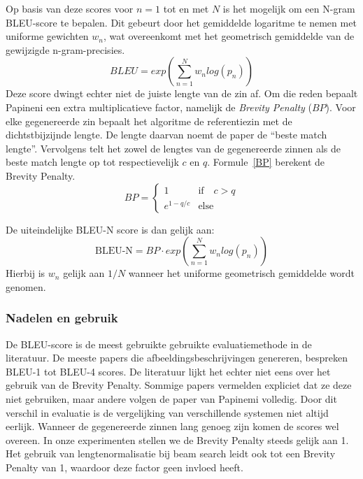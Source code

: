 Op basis van deze scores voor $n=1$ tot en met $N$ is het mogelijk om een N-gram BLEU-score te bepalen. Dit gebeurt door het gemiddelde logaritme te nemen met uniforme gewichten $w_n$, wat overeenkomt met het geometrisch gemiddelde van de gewijzigde n-gram-precisies.
\begin{equation}
BLEU = exp(\sum\limits_{n=1}^N w_nlog(p_n))
\end{equation}
Deze score dwingt echter niet de juiste lengte van de zin af. Om die reden bepaalt Papineni een extra multiplicatieve factor, namelijk de \emph{Brevity Penalty} ($BP$). Voor elke gegenereerde zin bepaalt het algoritme de referentiezin met de dichtstbijzijnde lengte. De lengte daarvan noemt de paper de ``beste match lengte''. Vervolgens telt het zowel de lengtes van de gegenereerde zinnen als de beste match lengte op tot respectievelijk $c$ en $q$. Formule~\eqref{BP} berekent de Brevity Penalty.
\begin{equation}BP=
 \begin{cases}
1 & \textrm{if}\quad c > q \\
e^{1-q/c} & \textrm{else}
\end{cases}
\label{BP}
\end{equation}

De uiteindelijke BLEU-N score is dan gelijk aan:
\begin{equation}
\text{BLEU-N} = BP\cdot exp(\sum\limits_{n=1}^N w_nlog(p_n))
\end{equation}
Hierbij is $w_n$ gelijk aan $1/N$ wanneer het uniforme geometrisch gemiddelde wordt genomen.

\subsubsection{Nadelen en gebruik}
De BLEU-score is de meest gebruikte gebruikte evaluatiemethode in de literatuur. De meeste papers die afbeeldingsbeschrijvingen genereren, bespreken BLEU-1 tot BLEU-4 scores. De literatuur lijkt het echter niet eens over het gebruik van de Brevity Penalty. Sommige papers vermelden expliciet dat ze deze niet gebruiken, maar andere volgen de paper van Papinemi volledig. Door dit verschil in evaluatie is de vergelijking van verschillende systemen niet altijd eerlijk. Wanneer de gegenereerde zinnen lang genoeg zijn komen de scores wel overeen.
In onze experimenten stellen we de Brevity Penalty steeds gelijk aan 1. Het gebruik van lengtenormalisatie bij beam search leidt ook tot een Brevity Penalty van 1, waardoor deze factor geen invloed heeft.

